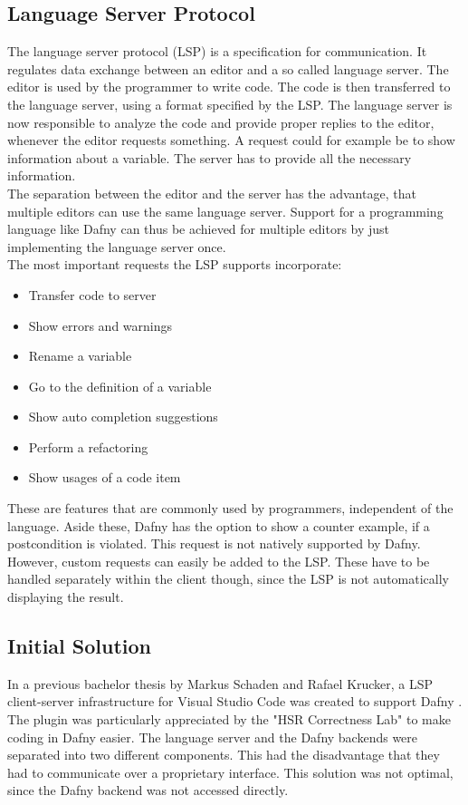 \subsection{Language Server Protocol}
The language server protocol (LSP) is a specification for communication.
It regulates data exchange between an editor and a so called language server.
The editor is used by the programmer to write code.
The code is then transferred to the language server, using a format specified by the LSP.
The language server is now responsible to analyze the code and provide proper replies to the editor, whenever the editor requests something.
A request could for example be to show information about a variable.
The server has to provide all the necessary information.\\

The separation between the editor and the server has the advantage, that multiple editors can use the same language server.
Support for a programming language like Dafny can thus be achieved for multiple editors by just implementing the language server once.\\

The most important requests the LSP supports incorporate:
\begin{itemize}
    \item Transfer code to server
    \item Show errors and warnings
    \item Rename a variable
    \item Go to the definition of a variable
    \item Show auto completion suggestions
    \item Perform a refactoring
    \item Show usages of a code item
\end{itemize}
These are features that are commonly used by programmers, independent of the language.
Aside these, Dafny has the option to show a counter example, if a postcondition is violated.
This request is not natively supported by Dafny.
However, custom requests can easily be added to the LSP.
These have to be handled separately within the client though, since the LSP is not automatically displaying the result.


\subsection{Initial Solution}
\label{section:management_summary:initialsolution}
In a previous bachelor thesis by Markus Schaden and Rafael Krucker, a LSP client-server infrastructure for Visual Studio Code was created to support Dafny \cite{ba}.
The plugin was particularly appreciated by the "HSR Correctness Lab" \cite{correctnessLab} to make coding in Dafny easier.
The language server and the Dafny backends were separated into two different components.
This had the disadvantage that they had to communicate over a proprietary interface.
This solution was not optimal, since the Dafny backend was not accessed directly.

